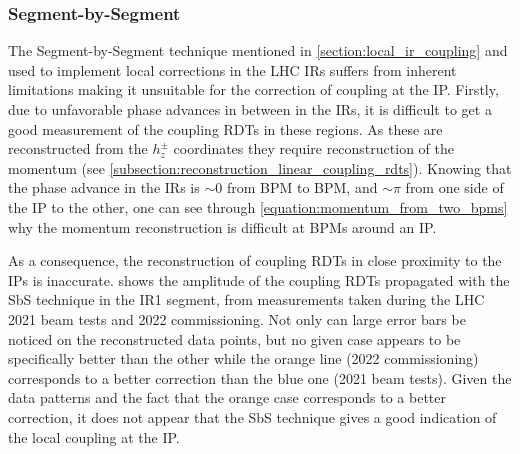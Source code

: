 \subsubsection*{Segment-by-Segment}

The Segment-by-Segment technique mentioned in \cref{section:local_ir_coupling} and used to implement local corrections in the LHC IRs suffers from inherent limitations making it unsuitable for the correction of coupling at the IP.
Firstly, due to unfavorable phase advances in between  in the IRs, it is difficult to get a good measurement of the coupling RDTs in these regions.
As these are reconstructed from the \(h_z^\pm\) coordinates they require reconstruction of the momentum (see \cref{subsection:reconstruction_linear_coupling_rdts}).
Knowing that the phase advance in the IRs is \(\sim 0\) from BPM to BPM, and \(\sim \pi\) from one side of the IP to the other, one can see through \cref{equation:momentum_from_two_bpms} why the momentum reconstruction is difficult at BPMs around an IP.

As a consequence, the reconstruction of coupling RDTs in close proximity to the IPs is inaccurate.
 shows the amplitude of the coupling RDTs propagated with the SbS technique in the IR\num{1} segment, from measurements taken during the LHC \num{2021} beam tests and \num{2022} commissioning.
Not only can large error bars be noticed on the reconstructed data points, but no given case appears to be specifically better than the other while the \textcolor{mplorange}{orange} line (\num{2022} commissioning) corresponds to a better correction than the \textcolor{mplblue}{blue} one (\num{2021} beam tests).
Given the data patterns and the fact that the orange case corresponds to a better correction, it does not appear that the SbS technique gives a good indication of the local coupling at the IP.

